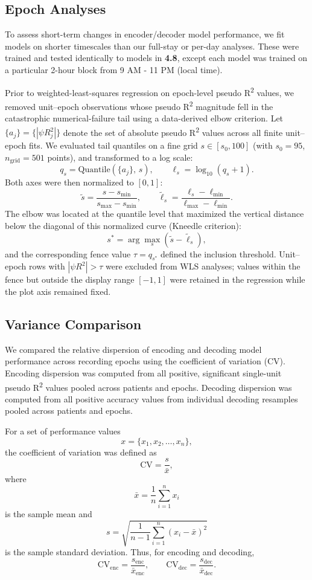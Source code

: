 \documentclass[pdflatex,sn-basic]{sn-jnl}%
\theoremstyle{thmstyleone}%
\theoremstyle{thmstyletwo}%
\theoremstyle{thmstylethree}%
\begin{document}
\subsection{Epoch Analyses}\label{subsec19}
To assess short-term changes in encoder/decoder model performance, we fit models on shorter timescales than our full-stay or per-day analyses. These were trained and tested identically to models in \textbf{4.8}, except each model was trained on a particular 2-hour block from 9 AM - 11 PM (local time).

Prior to weighted-least-squares regression on epoch-level pseudo R\textsuperscript{{2}} values, we removed unit--epoch observations whose pseudo R\textsuperscript{{2}} magnitude fell in the catastrophic numerical-failure tail using a data-derived elbow criterion. Let $\{a_j\} = \{|\psi R^2_j|\}$ denote the set of absolute pseudo R\textsuperscript{{2}} values across all finite unit--epoch fits. We evaluated tail quantiles on a fine grid $s \in [s_0, 100]$ (with $s_0 = 95$, $n_\text{grid} = 501$ points), and transformed to a log scale:
\[
q_s = \mathrm{Quantile}(\{a_j\},\, s), \qquad
\ell_s = \log_{10}(q_s + 1).
\]
Both axes were then normalized to $[0,1]$:
\[
\tilde{s} = \frac{s - s_{\min}}{s_{\max} - s_{\min}}, \qquad
\tilde{\ell}_s = \frac{\ell_s - \ell_{\min}}{\ell_{\max} - \ell_{\min}}.
\]
The elbow was located at the quantile level that maximized the vertical distance below the diagonal of this normalized curve (Kneedle criterion):
\[
s^{*} = \arg\max_{s}\!\left(\tilde{s} - \tilde{\ell}_{s}\right),
\]
and the corresponding fence value $\tau = q_{s^{*}}$ defined the inclusion threshold. Unit--epoch rows with $|\psi R^2| > \tau$ were excluded from WLS analyses; values within the fence but outside the display range $[-1, 1]$ were retained in the regression while the plot axis remained fixed.

\subsection{Variance Comparison}\label{subsec20}
We compared the relative dispersion of encoding and decoding model performance across recording epochs using the coefficient of variation (CV). Encoding dispersion was computed from all positive, significant single-unit pseudo R\textsuperscript{{2}} values pooled across patients and epochs. Decoding dispersion was computed from all positive accuracy values from individual decoding resamples pooled across patients and epochs.

For a set of performance values
\[
x = \{x_1, x_2, \ldots, x_n\},
\]
the coefficient of variation was defined as
\[
\mathrm{CV}
=
\frac{s}{\bar{x}},
\]
where
\[
\bar{x}
=
\frac{1}{n}\sum_{i=1}^{n} x_i
\]
is the sample mean and
\[
s
=
\sqrt{
\frac{1}{n-1}
\sum_{i=1}^{n}
(x_i - \bar{x})^2
}
\]
 is the sample standard deviation. Thus, for encoding and decoding,
\[
\mathrm{CV}_{\mathrm{enc}}
=
\frac{s_{\mathrm{enc}}}{\bar{x}_{\mathrm{enc}}},
\qquad
\mathrm{CV}_{\mathrm{dec}}
=
\frac{s_{\mathrm{dec}}}{\bar{x}_{\mathrm{dec}}}.
\]
\end{document}
